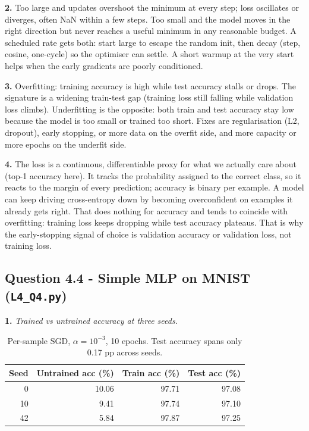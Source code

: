 \documentclass[11pt,a4paper]{article}
\newcommand{\Q}[1]{\subsection*{Question #1}}
\newcommand{\Qpart}[1]{\textbf{#1.}}
\begin{document}
\Qpart{2} Too large and updates overshoot the minimum at every step; loss oscillates or diverges, often NaN within a few steps. Too small and the model moves in the right direction but never reaches a useful minimum in any reasonable budget. A scheduled rate gets both: start large to escape the random init, then decay (step, cosine, one-cycle) so the optimiser can settle. A short warmup at the very start helps when the early gradients are poorly conditioned.

\Qpart{3} Overfitting: training accuracy is high while test accuracy stalls or drops. The signature is a widening train-test gap (training loss still falling while validation loss climbs). Underfitting is the opposite: both train and test accuracy stay low because the model is too small or trained too short. Fixes are regularisation (L2, dropout), early stopping, or more data on the overfit side, and more capacity or more epochs on the underfit side.

\Qpart{4} The loss is a continuous, differentiable proxy for what we actually care about (top-1 accuracy here). It tracks the probability assigned to the correct class, so it reacts to the margin of every prediction; accuracy is binary per example. A model can keep driving cross-entropy down by becoming overconfident on examples it already gets right. That does nothing for accuracy and tends to coincide with overfitting: training loss keeps dropping while test accuracy plateaus. That is why the early-stopping signal of choice is validation accuracy or validation loss, not training loss.

\Q{4.4 - Simple MLP on MNIST (\texttt{L4\_Q4.py})}

\Qpart{1} \textit{Trained vs untrained accuracy at three seeds.}

\begin{table}[h]
\centering
\small
\begin{tabular}{rrrr}
\toprule
Seed & Untrained acc (\%) & Train acc (\%) & Test acc (\%) \\
\midrule
0  & 10.06 & 97.71 & 97.08 \\
10 & 9.41  & 97.74 & 97.10 \\
42 & 5.84  & 97.87 & 97.25 \\
\bottomrule
\end{tabular}
\caption{Per-sample SGD, $\alpha = 10^{-3}$, 10 epochs. Test accuracy spans only 0.17 pp across seeds.}
\end{table}
\end{document}

